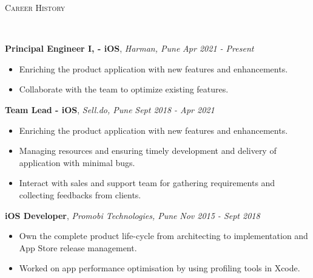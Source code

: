 \documentclass[9pt]{article}
\newenvironment{changemargin}[2]{%
  \begin{list}{}{%
    \setlength{\topsep}{0pt}%
    \setlength{\leftmargin}{#1}%
    \setlength{\rightmargin}{#2}%
    \setlength{\listparindent}{\parindent}%
    \setlength{\itemindent}{\parindent}%
    \setlength{\parsep}{\parskip}%
  }%
  \item[]}{\end{list}
}
\newcommand{\lineover}{
    \begin{changemargin}{-0.05in}{-0.05in}
        \vspace*{-8pt}
        \hrulefill \\
        \vspace*{-2pt}
    \end{changemargin}
}
\newcommand{\header}[1]{
    \begin{changemargin}{-0.5in}{-0.5in}
        \scshape{#1}\\
    \lineover
    \end{changemargin}
}
\newenvironment{body} {
    \vspace*{-16pt}
    \begin{changemargin}{-0.25in}{-0.5in}
  }
    {\end{changemargin}
}
\begin{document}
\header{Career History}

\begin{body}
    \vspace{14pt}
    \textbf{Principal Engineer I, - iOS}, \emph{Harman, Pune} \hfill \emph{Apr 2021 - Present}\\
    \begin{itemize} \itemsep -0pt  %
        \item Enriching the product application with new features and enhancements.
    \end{itemize}
    \begin{itemize} \itemsep -0pt  %
        \item Collaborate with the team to optimize existing features.
    \end{itemize}
    
    \vspace{14pt}
    \textbf{Team Lead - iOS}, \emph{Sell.do, Pune} \hfill \emph{Sept 2018 - Apr 2021}\\
    \begin{itemize} \itemsep -0pt  %
        \item Enriching the product application with new features and enhancements.
    \end{itemize}
    \begin{itemize} \itemsep -0pt  %
        \item Managing resources and ensuring timely development and delivery of application with minimal bugs.
    \end{itemize}
    \begin{itemize} \itemsep -0pt  %
        \item Interact with sales and support team for gathering requirements and collecting feedbacks from clients.
    \end{itemize}
    \vspace*{-4pt}

    \vspace{14pt}
    \textbf{iOS Developer}, \emph{Promobi Technologies, Pune} \hfill \emph{Nov 2015 - Sept 2018}\\
    \begin{itemize} \itemsep -0pt  %
        \item Own the complete product life-cycle from architecting to implementation and App Store release management.
    \end{itemize}
    \begin{itemize} \itemsep -0pt  %
        \item Worked on app performance optimisation by using profiling tools in Xcode.
    \end{itemize}
    \vspace*{-4pt}


\end{body}
\end{document}
